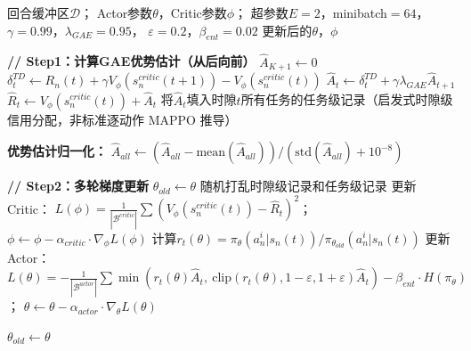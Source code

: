 \documentclass[a4paper,11pt]{article}
\begin{document}
\begin{algorithm}[t]
\caption{MAPPO网络参数更新（训练层）}
\label{alg:training}
\begin{algorithmic}[1]
\REQUIRE 回合缓冲区$\mathcal{D}$；
         Actor参数$\theta$，Critic参数$\phi$；
         超参数$E=2$，minibatch$=64$，
         $\gamma=0.99$，$\lambda_{GAE}=0.95$，
         $\varepsilon=0.2$，$\beta_{ent}=0.02$
\ENSURE 更新后的$\theta$，$\phi$

\STATE \textbf{// Step1：计算GAE优势估计（从后向前）}
    \STATE $\hat{A}_{K+1} \leftarrow 0$
        \STATE $\delta^{TD}_t \leftarrow R_n(t)
               + \gamma V_\phi(s^{critic}_n(t+1))
               - V_\phi(s^{critic}_n(t))$
        \STATE $\hat{A}_t \leftarrow \delta^{TD}_t
               + \gamma\lambda_{GAE}\hat{A}_{t+1}$
        \STATE $\hat{R}_t \leftarrow V_\phi(s^{critic}_n(t))
               + \hat{A}_t$
        \STATE 将$\hat{A}_t$填入时隙$t$所有任务的任务级记录（启发式时隙级信用分配，非标准逐动作 MAPPO 推导）
    \ENDFOR
\ENDFOR

\STATE \textbf{优势估计归一化：}
\STATE $\hat{A}_{all} \leftarrow
       (\hat{A}_{all} - \text{mean}(\hat{A}_{all}))
       / (\text{std}(\hat{A}_{all}) + 10^{-8})$

\STATE \textbf{// Step2：多轮梯度更新}
\STATE $\theta_{old} \leftarrow \theta$
    \STATE 随机打乱时隙级记录和任务级记录
        \STATE 更新Critic：
               $L(\phi) = \frac{1}{|\mathcal{B}^{critic}|}
               \sum(V_\phi(s^{critic}_n(t)) - \hat{R}_t)^2$；
               $\phi \leftarrow \phi - \alpha_{critic}\cdot\nabla_\phi L(\phi)$
        \STATE 计算$r_t(\theta) =
               \pi_\theta(a^i_n|s_n(t))
               / \pi_{\theta_{old}}(a^i_n|s_n(t))$
        \STATE 更新Actor：
               $L(\theta) = -\frac{1}{|\mathcal{B}^{actor}|}
               \sum\min(r_t(\theta)\hat{A}_t,\
               \text{clip}(r_t(\theta),
               1-\varepsilon, 1+\varepsilon)\hat{A}_t)
               - \beta_{ent}\cdot H(\pi_\theta)$；
               $\theta \leftarrow \theta - \alpha_{actor}\cdot\nabla_\theta L(\theta)$
    \ENDFOR
\ENDFOR

\STATE $\theta_{old} \leftarrow \theta$
\end{algorithmic}
\end{algorithm}

\end{document}

